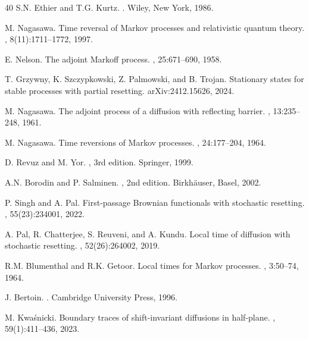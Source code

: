 \documentclass[11pt,a4paper]{article}
\theoremstyle{definition}
\theoremstyle{remark}
\begin{document}
\begin{thebibliography}{40}
	S.N. Ethier and T.G. Kurtz.
	.
	\newblock Wiley, New York, 1986.
	
	M. Nagasawa.
	\newblock Time reversal of Markov processes and relativistic quantum theory.
	, 8(11):1711--1772, 1997.
	
	E. Nelson.
	\newblock The adjoint Markoff process.
	, 25:671--690, 1958.
	
	T. Grzywny, K. Szczypkowski, Z. Palmowski, and B. Trojan.
	\newblock Stationary states for stable processes with partial resetting.
	 arXiv:2412.15626, 2024.
	
	M. Nagasawa.
	\newblock The adjoint process of a diffusion with reflecting barrier.
	, 13:235--248, 1961.
	
	M. Nagasawa.
	\newblock Time reversions of Markov processes.
	, 24:177--204, 1964.
	
	D. Revuz and M. Yor.
	, 3rd edition.
	\newblock Springer, 1999.
	
	A.N. Borodin and P. Salminen.
	, 2nd edition.
	\newblock Birkhäuser, Basel, 2002.
	
	P. Singh and A. Pal.
	\newblock First-passage Brownian functionals with stochastic resetting.
	, 55(23):234001, 2022.
	
	A. Pal, R. Chatterjee, S. Reuveni, and A. Kundu.
	\newblock Local time of diffusion with stochastic resetting.
	, 52(26):264002, 2019.
	
	R.M. Blumenthal and R.K. Getoor.
	\newblock Local times for Markov processes.
	, 3:50--74, 1964.
	
	J. Bertoin.
	.
	\newblock Cambridge University Press, 1996.
	
	M. Kwaśnicki.
	\newblock Boundary traces of shift-invariant diffusions in half-plane.
	, 59(1):411--436, 2023.
	

\end{thebibliography}
\end{document}
